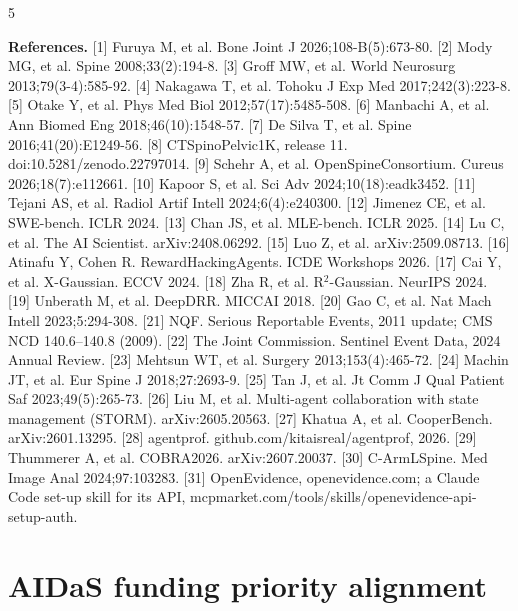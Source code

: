 \documentclass[10pt,letterpaper]{article}
\begin{document}
{\fontsize{5.8}{6.6}\selectfont\setlength{\multicolsep}{1pt}
\begin{multicols}{5}
\raggedright
\textbf{References.}
[1] Furuya M, et al. Bone Joint J 2026;108-B(5):673-80.
[2] Mody MG, et al. Spine 2008;33(2):194-8.
[3] Groff MW, et al. World Neurosurg 2013;79(3-4):585-92.
[4] Nakagawa T, et al. Tohoku J Exp Med 2017;242(3):223-8.
[5] Otake Y, et al. Phys Med Biol 2012;57(17):5485-508.
[6] Manbachi A, et al. Ann Biomed Eng 2018;46(10):1548-57.
[7] De Silva T, et al. Spine 2016;41(20):E1249-56.
[8] CTSpinoPelvic1K, release 11. doi:10.5281/zenodo.22797014.
[9] Schehr A, et al. OpenSpineConsortium. Cureus 2026;18(7):e112661.
[10] Kapoor S, et al. Sci Adv 2024;10(18):eadk3452.
[11] Tejani AS, et al. Radiol Artif Intell 2024;6(4):e240300.
[12] Jimenez CE, et al. SWE-bench. ICLR 2024.
[13] Chan JS, et al. MLE-bench. ICLR 2025.
[14] Lu C, et al. The AI Scientist. arXiv:2408.06292.
[15] Luo Z, et al. arXiv:2509.08713.
[16] Atinafu Y, Cohen R. RewardHackingAgents. ICDE Workshops 2026.
[17] Cai Y, et al. X-Gaussian. ECCV 2024.
[18] Zha R, et al. R$^2$-Gaussian. NeurIPS 2024.
[19] Unberath M, et al. DeepDRR. MICCAI 2018.
[20] Gao C, et al. Nat Mach Intell 2023;5:294-308.
[21] NQF. Serious Reportable Events, 2011 update; CMS NCD 140.6--140.8 (2009).
[22] The Joint Commission. Sentinel Event Data, 2024 Annual Review.
[23] Mehtsun WT, et al. Surgery 2013;153(4):465-72.
[24] Machin JT, et al. Eur Spine J 2018;27:2693-9.
[25] Tan J, et al. Jt Comm J Qual Patient Saf 2023;49(5):265-73.
[26] Liu M, et al. Multi-agent collaboration with state management (STORM). arXiv:2605.20563.
[27] Khatua A, et al. CooperBench. arXiv:2601.13295.
[28] agentprof. github.com/kitaisreal/agentprof, 2026.
[29] Thummerer A, et al. COBRA2026. arXiv:2607.20037.
[30] C-ArmLSpine. Med Image Anal 2024;97:103283.
[31] OpenEvidence, openevidence.com; a Claude Code set-up skill for its API, mcpmarket.com/\allowbreak tools/\allowbreak skills/\allowbreak openevidence-api-setup-auth.
\end{multicols}}
\endgroup

\clearpage
\section*{AIDaS funding priority alignment}
\end{document}
